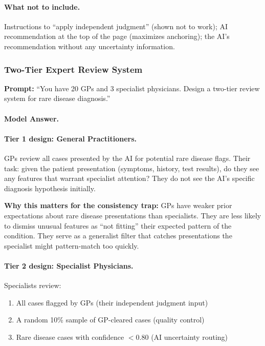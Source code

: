 \paragraph{What not to include.}

Instructions to ``apply independent judgment'' (shown not to work); AI recommendation at the top of the page (maximizes anchoring); the AI's recommendation without any uncertainty information.

\subsubsection{Two-Tier Expert Review System}

\textbf{Prompt:} ``You have 20 GPs and 3 specialist physicians. Design a two-tier review system for rare disease diagnosis.''

\paragraph{Model Answer.}

\paragraph{Tier 1 design: General Practitioners.}

GPs review all cases presented by the AI for potential rare disease flags. Their task: given the patient presentation (symptoms, history, test results), do they see any features that warrant specialist attention? They do not see the AI's specific diagnosis hypothesis initially.

\textbf{Why this matters for the consistency trap:} GPs have weaker prior expectations about rare disease presentations than specialists. They are less likely to dismiss unusual features as ``not fitting'' their expected pattern of the condition. They serve as a generalist filter that catches presentations the specialist might pattern-match too quickly.

\paragraph{Tier 2 design: Specialist Physicians.}

Specialists review:
\begin{enumerate}
    \item All cases flagged by GPs (their independent judgment input)
    \item A random 10\% sample of GP-cleared cases (quality control)
    \item Rare disease cases with confidence $< 0.80$ (AI uncertainty routing)
\end{enumerate}

